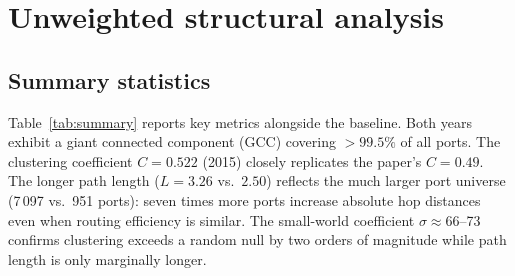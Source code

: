 \documentclass[a4paper,10pt,twocolumn]{article}
\begin{document}
\section{Unweighted structural analysis}

\subsection{Summary statistics}

Table~\ref{tab:summary} reports key metrics alongside the
\citet{Kaluza2010} baseline.
Both years exhibit a giant connected component (GCC) covering
$>99.5\%$ of all ports.
The clustering coefficient $C=0.522$ (2015) closely replicates
the paper's $C=0.49$.
The longer path length ($L=3.26$ vs.\ $2.50$) reflects the much
larger port universe (7\,097 vs.\ 951 ports): seven times more ports
increase absolute hop distances even when routing efficiency is
similar.
The small-world coefficient $\sigma\approx66$--73 confirms clustering
exceeds a random null by two orders of magnitude while path length
is only marginally longer.
\end{document}
